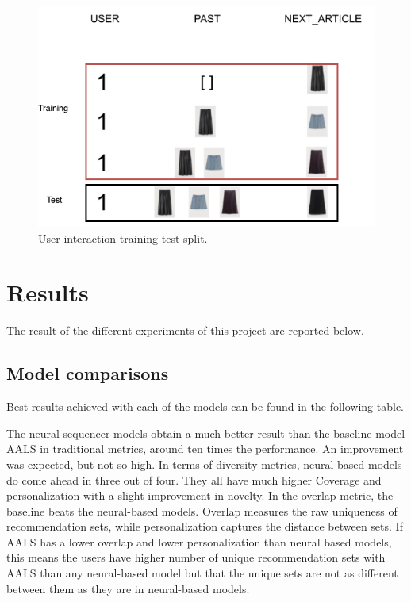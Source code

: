 \documentclass{kththesis}
\begin{document}
\begin{figure}[H]
    \centering
    \includegraphics[scale=0.45]{images/dataset/datasetsplit.png}
    \caption{User interaction training-test split.}
\end{figure}

\section{Results}
The result of the different experiments of this project are reported below.

\subsection{Model comparisons}
Best results achieved with each of the models can be found in the following table.

\begin{center}

\end{center}

The neural sequencer models obtain a much better result than the baseline model AALS in traditional metrics, around ten times the performance. An improvement was expected, but not so high. In terms of diversity metrics, neural-based models do come ahead in three out of four. They all have much higher Coverage and personalization with a slight improvement in novelty. In the overlap metric, the baseline beats the neural-based models. Overlap measures the raw uniqueness of recommendation sets, while personalization captures the distance between sets. If AALS has a lower overlap and lower personalization than neural based models, this means the users have higher number of unique recommendation sets with AALS than any neural-based model but that the unique sets are not as different between them as they are in neural-based models. 
\end{document}
